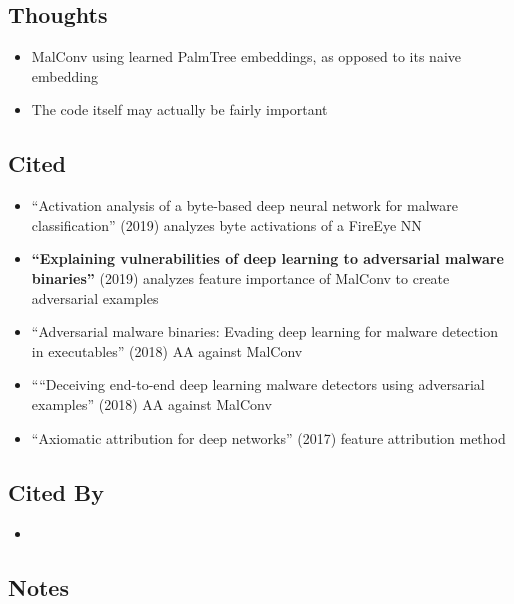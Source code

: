 \documentclass{article}
\begin{document}
\subsection*{Thoughts}
\begin{itemize}
	\item MalConv using learned PalmTree embeddings, as opposed to its naive embedding
	\item The code itself may actually be fairly important
\end{itemize}

\subsection*{Cited}
\begin{itemize}
	\item ``Activation analysis of a byte-based deep neural network for malware classification'' (2019) analyzes byte activations of a FireEye NN
	\item \textbf{``Explaining vulnerabilities of deep learning to adversarial malware binaries''} (2019) analyzes feature importance of MalConv to create adversarial examples
	\item ``Adversarial malware binaries: Evading deep learning for malware detection in executables'' (2018) AA against MalConv
	\item ``“Deceiving end-to-end deep learning malware detectors using
	adversarial examples'' (2018) AA against MalConv
	\item ``Axiomatic attribution for deep networks'' (2017) feature attribution method
\end{itemize}

\subsection*{Cited By}
\begin{itemize}
	\item
\end{itemize}

\subsection*{Notes}
\end{document}
